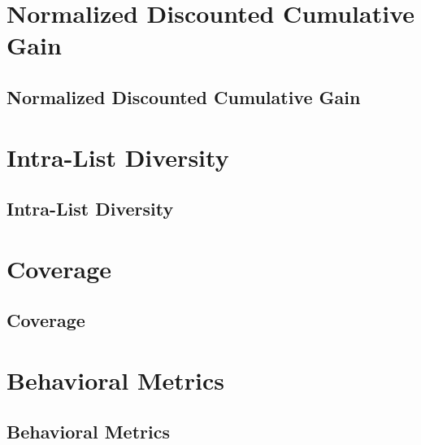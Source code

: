 \clearpage
\thispagestyle{rankingstyle}
\section{Normalized Discounted Cumulative Gain}
\subsection{Normalized Discounted Cumulative Gain}

\clearpage
\thispagestyle{rankingstyle}
\section{Intra-List Diversity}
\subsection{Intra-List Diversity}

\clearpage
\thispagestyle{rankingstyle}
\section{Coverage}
\subsection{Coverage}

\clearpage
\thispagestyle{rankingstyle}
\section{Behavioral Metrics}
\subsection{Behavioral Metrics}



